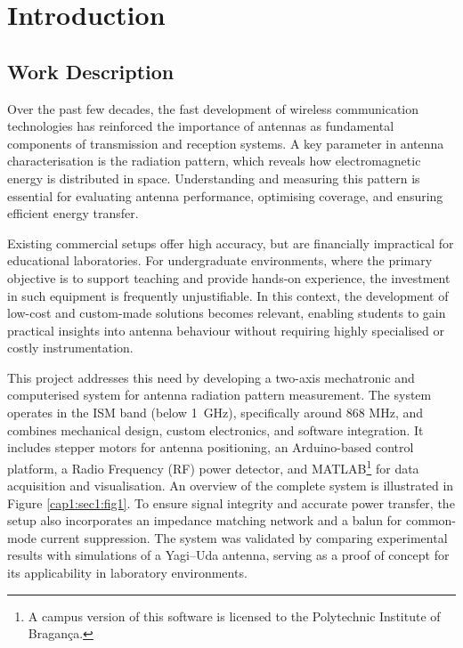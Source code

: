 \chapter{Introduction}

\section{Work Description}

Over the past few decades, the fast development of wireless communication technologies has reinforced the importance of antennas as fundamental components of transmission and reception systems. A key parameter in antenna characterisation is the radiation pattern, which reveals how electromagnetic energy is distributed in space. Understanding and measuring this pattern is essential for evaluating antenna performance, optimising coverage, and ensuring efficient energy transfer. 

Existing commercial setups offer high accuracy, but are financially impractical for educational laboratories. For undergraduate environments, where the primary objective is to support teaching and provide hands-on experience, the investment in such equipment is frequently unjustifiable. In this context, the development of low-cost and custom-made solutions becomes relevant, enabling students to gain practical insights into antenna behaviour without requiring highly specialised or costly instrumentation.

This project addresses this need by developing a two-axis mechatronic and computerised system for antenna radiation pattern measurement. The system operates in the ISM band (below 1~GHz), specifically around 868 MHz, and combines mechanical design, custom electronics, and software integration. It includes stepper motors for antenna positioning, an Arduino-based control platform, a Radio Frequency (RF) power detector, and MATLAB\footnote{A campus version of this software is licensed to the Polytechnic Institute of Bragança.} for data acquisition and visualisation. An overview of the complete system is illustrated in Figure \ref{cap1:sec1:fig1}. To ensure signal integrity and accurate power transfer, the setup also incorporates an impedance matching network and a balun for common-mode current suppression. The system was validated by comparing experimental results with simulations of a Yagi–Uda antenna, serving as a proof of concept for its applicability in laboratory environments.

